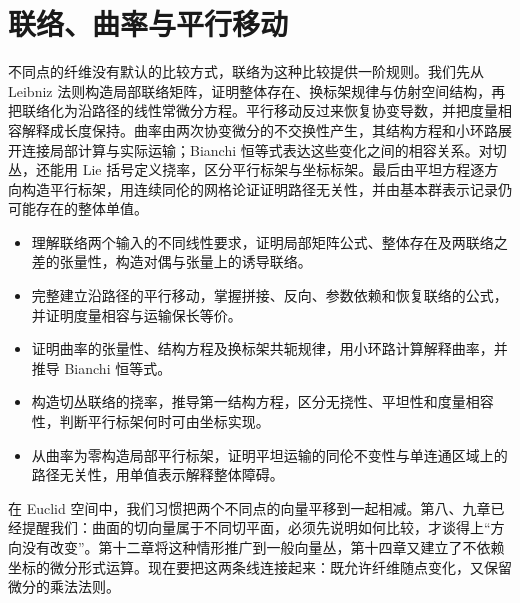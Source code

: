 
% 
% 

\chapter{联络、曲率与平行移动}
\label{g1:ch:15}

\begin{chapterabstract}
	不同点的纤维没有默认的比较方式，联络为这种比较提供一阶规则。我们先从 Leibniz 法则构造局部联络矩阵，证明整体存在、换标架规律与仿射空间结构，再把联络化为沿路径的线性常微分方程。平行移动反过来恢复协变导数，并把度量相容解释成长度保持。曲率由两次协变微分的不交换性产生，其结构方程和小环路展开连接局部计算与实际运输；Bianchi 恒等式表达这些变化之间的相容关系。对切丛，还能用 Lie 括号定义挠率，区分平行标架与坐标标架。最后由平坦方程逐方向构造平行标架，用连续同伦的网格论证证明路径无关性，并由基本群表示记录仍可能存在的整体单值。
\end{chapterabstract}

\begin{learninggoals}
	\begin{itemize}
		\item 理解联络两个输入的不同线性要求，证明局部矩阵公式、整体存在及两联络之差的张量性，构造对偶与张量上的诱导联络。
		\item 完整建立沿路径的平行移动，掌握拼接、反向、参数依赖和恢复联络的公式，并证明度量相容与运输保长等价。
		\item 证明曲率的张量性、结构方程及换标架共轭规律，用小环路计算解释曲率，并推导 Bianchi 恒等式。
		\item 构造切丛联络的挠率，推导第一结构方程，区分无挠性、平坦性和度量相容性，判断平行标架何时可由坐标实现。
		\item 从曲率为零构造局部平行标架，证明平坦运输的同伦不变性与单连通区域上的路径无关性，用单值表示解释整体障碍。
	\end{itemize}
\end{learninggoals}

在 Euclid 空间中，我们习惯把两个不同点的向量平移到一起相减。第八、九章已经提醒我们：曲面的切向量属于不同切平面，必须先说明如何比较，才谈得上“方向没有改变”。第十二章将这种情形推广到一般向量丛，第十四章又建立了不依赖坐标的微分形式运算。现在要把这两条线连接起来：既允许纤维随点变化，又保留微分的乘法法则。

